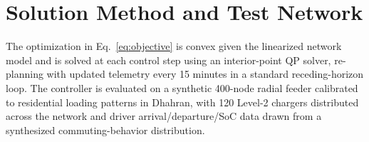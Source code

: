 \section{Solution Method and Test Network}
The optimization in Eq.~\eqref{eq:objective} is convex given the linearized network model and
is solved at each control step using an interior-point QP solver, re-planning with updated
telemetry every 15 minutes in a standard receding-horizon loop. The controller is evaluated on
a synthetic 400-node radial feeder calibrated to residential loading patterns in Dhahran, with
120 Level-2 chargers distributed across the network and driver arrival/departure/SoC data drawn
from a synthesized commuting-behavior distribution.


